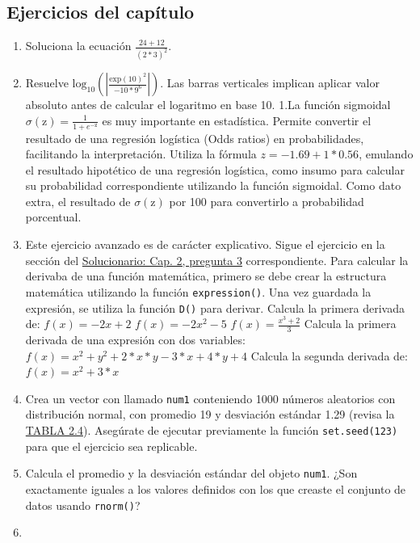 \documentclass[
]{article}
\providecommand{\tightlist}{%
  \setlength{\itemsep}{0pt}\setlength{\parskip}{0pt}}
\theoremstyle{definition}
\theoremstyle{definition}
\theoremstyle{definition}
\theoremstyle{definition}
\theoremstyle{remark}
\begin{document}
\hypertarget{ejercicios-del-capuxedtulo}{%
\subsection{Ejercicios del capítulo}\label{ejercicios-del-capuxedtulo}}

\begin{enumerate}
\def\labelenumi{\arabic{enumi}.}
\tightlist
\item
  Soluciona la ecuación \(\frac{24+12}{(2 * 3)^2}\).
\item
  Resuelve \(\mathrm{log_{10}}(|\frac{\mathrm{exp(10)}^2}{-10*9^{6}}|)\). Las barras verticales implican aplicar valor absoluto antes de calcular el logaritmo en base 10.
  1.La función sigmoidal \(\sigma(\mathrm{z}) = \frac{1}{1+e^{-\mathrm{z}}}\) es muy importante en estadística. Permite convertir el resultado de una regresión logística (Odds ratios) en probabilidades, facilitando la interpretación. Utiliza la fórmula \(z = -1.69 + 1*0.56\), emulando el resultado hipotético de una regresión logística, como insumo para calcular su probabilidad correspondiente utilizando la función sigmoidal. Como dato extra, el resultado de \(\sigma(\mathrm{z})\) por 100 para convertirlo a probabilidad porcentual.
\item
  Este ejercicio avanzado es de carácter explicativo. Sigue el ejercicio en la sección del \protect\hyperlink{cap.-2-primer-contacto-con-r}{Solucionario: Cap. 2, pregunta 3} correspondiente. Para calcular la derivaba de una función matemática, primero se debe crear la estructura matemática utilizando la función \texttt{expression()}. Una vez guardada la expresión, se utiliza la función \texttt{D()} para derivar.
  Calcula la primera derivada de:
  \(f(x)=-2x+2\)
  \(f(x)=-2x^2-5\)
  \(f(x)=\frac{x^3+2}{3}\)
  Calcula la primera derivada de una expresión con dos variables:
  \(f(x)=x^2+y^2+2*x*y-3*x+4*y+4\)
  Calcula la segunda derivada de:
  \(f(x)=x^2+3*x\)
\item
  Crea un vector con llamado \texttt{num1} conteniendo 1000 números aleatorios con distribución normal, con promedio 19 y desviación estándar 1.29 (revisa la \protect\hyperlink{funciones-buxe1sica-uxfatiles}{TABLA 2.4}).
  Asegúrate de ejecutar previamente la función \texttt{set.seed(123)} para que el ejercicio sea replicable.
\item
  Calcula el promedio y la desviación estándar del objeto \texttt{num1}. ¿Son exactamente iguales a los valores definidos con los que creaste el conjunto de datos usando \texttt{rnorm()}?
\item

\end{enumerate}
\end{document}
